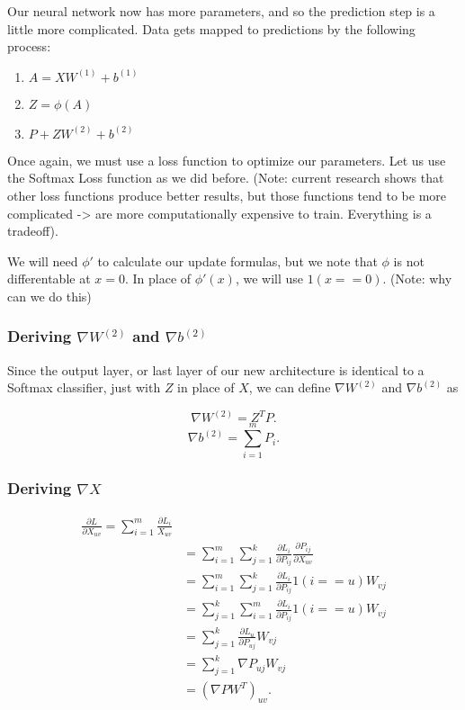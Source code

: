 Our neural network now has more parameters, and so the prediction step is a
little more complicated. Data gets mapped to predictions by the following
process:
\begin{enumerate}
\item $A = XW^{(1)} + b^{(1)}$
\item $Z = \phi(A)$
\item $P + ZW^{(2)} + b^{(2)}$
\end{enumerate}

Once again, we must use a loss function to optimize our parameters. Let us use
the Softmax Loss function as we did before. (Note: current research shows that
other loss functions produce better results, but those functions tend to be
more complicated -> are more computationally expensive to train. Everything is
a tradeoff).

We will need $\phi\prime$ to calculate our update formulas, but we note that
$\phi$ is not differentable at $x=0$. In place of $\phi\prime(x)$, we will use
$1(x == 0)$. (Note: why can we do this)

\subsubsection{Deriving $\nabla W^{(2)}$ and $\nabla b^{(2)}$}
Since the output layer, or last layer of our new architecture is identical to a
Softmax classifier, just with $Z$ in place of $X$, we can define $\nabla
W^{(2)}$ and $\nabla b^{(2)}$ as

$$ \nabla W^{(2)}  = Z^T P. $$
$$ \nabla b^{(2)}  = \sum_{i=1}^m P_i. $$

\subsubsection{Deriving $\nabla X$}
\begin{align*}
  \frac{\partial L}{\partial X_{uv}}
    =\sum_{i=1}^m \frac{\partial L_i}{X_{uv}}\\
  &= \sum_{i=1}^m \sum_{j=1}^k \frac{\partial L_i}{\partial P_{ij}}
      \frac{\partial P_{ij}}{\partial X_{uv}}\\
  &= \sum_{i=1}^m \sum_{j=1}^k \frac{\partial L_i}{\partial P_{ij}}
      1(i == u) W_{vj}\\
  &= \sum_{j=1}^k \sum_{i=1}^m \frac{\partial L_i}{\partial P_{ij}}
      1(i == u) W_{vj}\\
  &= \sum_{j=1}^k \frac{\partial L_u}{\partial P_{uj}} W_{vj}\\
  &= \sum_{j=1}^k \nabla P_{uj} W_{vj}\\
  &= \left( \nabla P W^T \right) _{uv}.
\end{align*}

